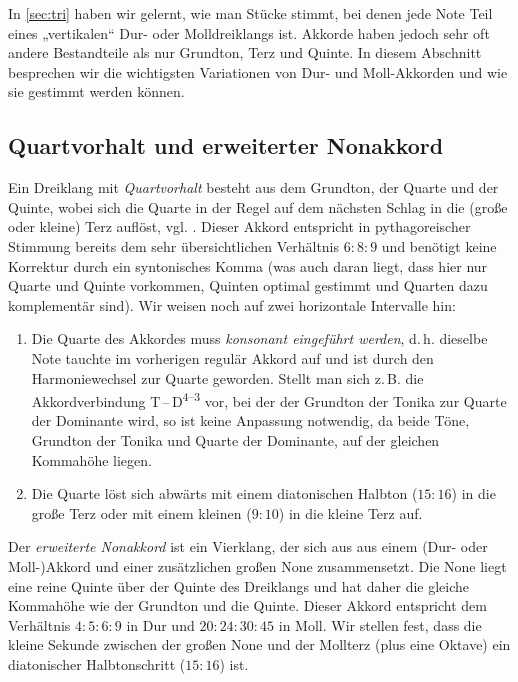 In \cref{sec:tri} haben wir gelernt, wie man Stücke stimmt, bei denen jede Note
Teil eines „vertikalen“ Dur- oder Molldreiklangs ist. Akkorde haben jedoch sehr
oft andere Bestandteile als nur Grundton, Terz und Quinte. In diesem Abschnitt
besprechen wir die wichtigsten Variationen von Dur- und Moll-Akkorden und wie
sie gestimmt werden können.

\subsection{Quartvorhalt und erweiterter Nonakkord}
\label{sec:49}

Ein Dreiklang mit \emph{Quartvorhalt} besteht aus dem Grundton, der Quarte und
der Quinte, wobei sich die Quarte in der Regel auf dem nächsten Schlag in die
(große oder kleine) Terz auflöst, vgl. \cite[{}8.2]{Skript}. Dieser Akkord
entspricht in pythagoreischer Stimmung bereits dem sehr übersichtlichen
Verhältnis $6:8:9$ und benötigt keine Korrektur durch ein syntonisches Komma
(was auch daran liegt, dass hier nur Quarte und Quinte vorkommen, Quinten
optimal gestimmt und Quarten dazu komplementär sind).  Wir weisen noch auf zwei
horizontale Intervalle hin:
\begin{enumerate}
\item Die Quarte des Akkordes muss \emph{konsonant eingeführt werden},
  d.\,h. dieselbe Note tauchte im vorherigen regulär Akkord auf und ist durch
  den Harmoniewechsel zur Quarte geworden. Stellt man sich z.\,B. die
  Akkordverbindung T\,–\,D\textsuperscript{$4$–$3$} vor, bei der der Grundton
  der Tonika zur Quarte der Dominante wird, so ist keine Anpassung notwendig, da
  beide Töne, Grundton der Tonika und Quarte der Dominante, auf der gleichen
  Kommahöhe liegen.
\item Die Quarte löst sich abwärts mit einem diatonischen Halbton ($15:16$) in
  die große Terz oder mit einem kleinen  ($9:10$) in die kleine Terz
  auf.
\end{enumerate}

Der \emph{erweiterte Nonakkord} ist ein Vierklang, der sich aus aus einem (Dur-
oder Moll-)Akkord und einer zusätzlichen großen None zusammensetzt.  Die None
liegt eine reine Quinte über der Quinte des Dreiklangs und hat daher die gleiche
Kommahöhe wie der Grundton und die Quinte. Dieser
Akkord entspricht dem Verhältnis $4:5:6:9$ in Dur und $20:24:30:45$ in Moll. Wir
stellen fest, dass die kleine Sekunde zwischen der großen None und der Mollterz
(plus eine Oktave) ein diatonischer Halbtonschritt ($15:16$) ist.

